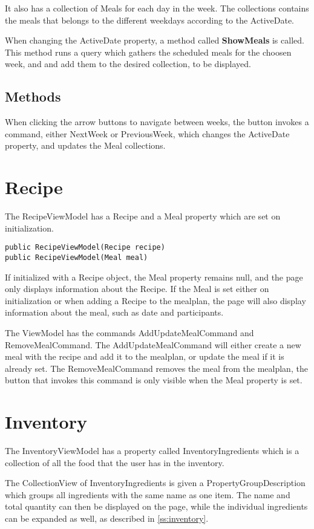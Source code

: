 It also has a collection of Meals for each day in the week. The collections contains the meals that belongs to the different weekdays according to the ActiveDate.

When changing the ActiveDate property, a method called \textbf{ShowMeals} is called. This method runs a query which gathers the scheduled meals for the choosen week, and and add them to the desired collection, to be displayed. 

\subsection{Methods}
When clicking the arrow buttons to navigate between weeks, the button invokes a command, either NextWeek or PreviousWeek, which changes the ActiveDate property, and updates the Meal collections.


\section{Recipe}

The RecipeViewModel has a Recipe and a Meal property which are set on initialization.
\begin{lstlisting}[caption=Recipe ViewModel Constructors., language=CSharp]
public RecipeViewModel(Recipe recipe)
public RecipeViewModel(Meal meal)
\end{lstlisting}
        

If initialized with a Recipe object, the Meal property remains null, and the page only displays information about the Recipe. If the Meal is set either on initialization or when adding a Recipe to the mealplan, the page will also display information about the meal, such as date and participants.

The ViewModel has the commands AddUpdateMealCommand and RemoveMealCommand. The AddUpdateMealCommand will either create a new meal with the recipe and add it to the mealplan, or update the meal if it is already set.
The RemoveMealCommand removes the meal from the mealplan, the button that invokes this command is only visible when the Meal property is set.


\section{Inventory}
The InventoryViewModel has a property called InventoryIngredients which is a collection of all the food that the user has in the inventory.

The CollectionView of InventoryIngredients is given a PropertyGroupDescription which groups all ingredients with the same name as one item. The name and total quantity can then be displayed on the page, while the individual ingredients can be expanded as well, as described in \cref{ss:inventory}.

